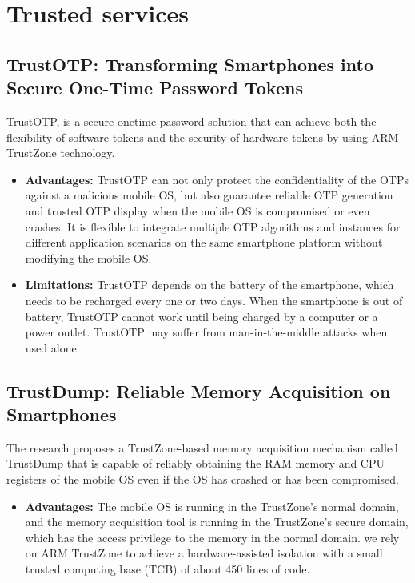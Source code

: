 \documentclass[conference]{IEEEtran}
\begin{document}
\section{Trusted services}

\subsection{TrustOTP: Transforming Smartphones into Secure One-Time Password Tokens}
\cite{trust1} TrustOTP, is a secure onetime password solution that can achieve both the flexibility of software tokens and the security of hardware tokens by using ARM TrustZone technology.
\begin{itemize}
    \item \textbf{Advantages:} TrustOTP can not only protect the confidentiality of the OTPs against a malicious mobile OS, but also guarantee reliable OTP generation and trusted OTP display when the mobile OS is compromised or even crashes. It is flexible to integrate multiple OTP algorithms and instances for different application scenarios on the same smartphone platform without modifying the mobile OS.
    \item \textbf{Limitations:} TrustOTP depends on the battery of the smartphone, which needs to be recharged every one or two days. When the smartphone is out of battery, TrustOTP cannot work until being charged by a computer or a power outlet. TrustOTP may suffer from man-in-the-middle attacks when used alone.
\end{itemize}


\subsection{TrustDump: Reliable Memory Acquisition on Smartphones}
\cite{trust2} The research proposes a TrustZone-based memory acquisition mechanism called TrustDump that is capable of reliably obtaining the RAM memory and CPU registers of the mobile OS even if the OS has crashed or has been compromised.
\begin{itemize}
    \item \textbf{Advantages:} The mobile OS is running in the TrustZone’s normal domain, and the memory acquisition tool is running in the TrustZone’s secure domain, which has the access privilege to the memory in the normal domain.  we rely on ARM TrustZone to achieve a hardware-assisted isolation with a small trusted computing base (TCB) of about 450 lines of code.
\end{itemize}
\end{document}
